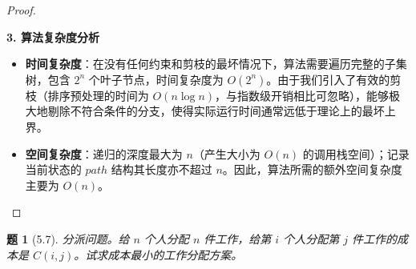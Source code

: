 \documentclass[11pt, a4paper]{article}
\newtheorem{problem}{题}
\begin{document}
\begin{proof}
\begin{algorithm}[H]
    
     \;
    \end{algorithm}

    \textbf{3. 算法复杂度分析}
    
    \begin{itemize}
        \item \textbf{时间复杂度}：在没有任何约束和剪枝的最坏情况下，算法需要遍历完整的子集树，包含 $2^n$ 个叶子节点，时间复杂度为 $O(2^n)$。由于我们引入了有效的剪枝（排序预处理的时间为 $O(n \log n)$，与指数级开销相比可忽略），能够极大地剔除不符合条件的分支，使得实际运行时间通常远低于理论上的最坏上界。
        \item \textbf{空间复杂度}：递归的深度最大为 $n$（产生大小为 $O(n)$ 的调用栈空间）；记录当前状态的 $path$ 结构其长度亦不超过 $n$。因此，算法所需的额外空间复杂度主要为 $O(n)$。
    \end{itemize}
\end{proof}

\begin{problem}[5.7]
    分派问题。给 $n$ 个人分配 $n$ 件工作，给第 $i$ 个人分配第 $j$ 件工作的成本是 $C(i,j)$。试求成本最小的工作分配方案。
\end{problem}
\end{document}
